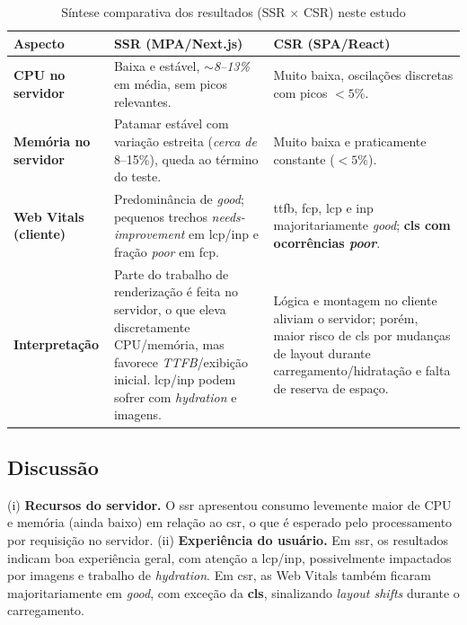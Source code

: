\begin{table}[H]
\centering
\caption{Síntese comparativa dos resultados (SSR $\times$ CSR) neste estudo}
\label{tab:comparativo-ssr-csr}
\begin{tabular}{|p{4.0cm}|p{5.2cm}|p{5.2cm}|}
\hline
\textbf{Aspecto} & \textbf{SSR (MPA/Next.js)} & \textbf{CSR (SPA/React)} \\
\hline
\textbf{CPU no servidor} & Baixa e estável, \textit{$\sim$8--13\%} em média, sem picos relevantes. & Muito baixa, oscilações discretas com picos $<5\%$. \\
\hline
\textbf{Memória no servidor} & Patamar estável com variação estreita (\textit{cerca de} 8--15\%), queda ao término do teste. & Muito baixa e praticamente constante ($<5\%$). \\
\hline
\textbf{Web Vitals (cliente)} & Predominância de \textit{good}; pequenos trechos \textit{needs-improvement} em \acrshort{lcp}/\acrshort{inp} e fração \textit{poor} em \acrshort{fcp}. & \acrshort{ttfb}, \acrshort{fcp}, \acrshort{lcp} e \acrshort{inp} majoritariamente \textit{good}; \textbf{\acrshort{cls} com ocorrências \textit{poor}}. \\
\hline
\textbf{Interpretação} & Parte do trabalho de renderização é feita no servidor, o que eleva discretamente CPU/memória, mas favorece \textit{TTFB}/exibição inicial. \acrshort{lcp}/\acrshort{inp} podem sofrer com \textit{hydration} e imagens. & Lógica e montagem no cliente aliviam o servidor; porém, maior risco de \acrshort{cls} por mudanças de layout durante carregamento/hidratação e falta de reserva de espaço. \\
\hline
\end{tabular}
\end{table}

\subsection{Discussão}
(i) \textbf{Recursos do servidor.} O \acrshort{ssr} apresentou consumo levemente maior de CPU e memória (ainda baixo) em relação ao \acrshort{csr}, o que é esperado pelo processamento por requisição no servidor.
(ii) \textbf{Experiência do usuário.} Em \acrshort{ssr}, os resultados indicam boa experiência geral, com atenção a \acrshort{lcp}/\acrshort{inp}, possivelmente impactados por imagens e trabalho de \textit{hydration}. Em \acrshort{csr}, as Web Vitals também ficaram majoritariamente em \textit{good}, com exceção da \textbf{\acrshort{cls}}, sinalizando \textit{layout shifts} durante o carregamento.

